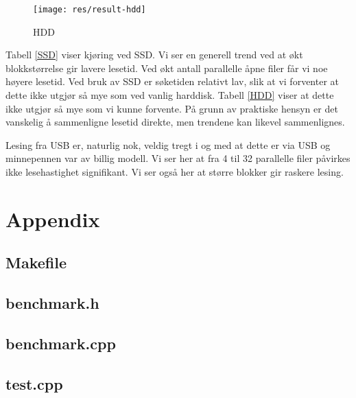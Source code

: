\documentclass[titlepage]{article}
\begin{document}
\begin{figure}[h!]
  \caption{HDD}
  \centering
  \texttt{[image: res/result-hdd]}
\end{figure}

Tabell \ref{SSD} viser kjøring ved SSD. Vi ser en generell trend ved at økt blokkstørrelse gir lavere lesetid.
Ved økt antall parallelle åpne filer får vi noe høyere lesetid. 
Ved bruk av SSD er søketiden relativt lav, slik at vi forventer at dette ikke utgjør så mye som ved vanlig harddisk. Tabell \ref{HDD} viser at dette ikke utgjør så mye som vi kunne forvente.
På grunn av praktiske hensyn er det vanskelig å sammenligne lesetid direkte, men trendene kan likevel sammenlignes.

Lesing fra USB er, naturlig nok, veldig tregt i og med at dette er via USB og minnepennen var av billig modell. Vi ser her at fra 4 til 32 parallelle filer påvirkes ikke lesehastighet signifikant. Vi ser også her at større blokker gir raskere lesing.

\clearpage
\section{Appendix}
\subsection{Makefile}


\clearpage
\subsection{benchmark.h}


\clearpage
\subsection{benchmark.cpp}


\clearpage
\subsection{test.cpp}

\end{document}
